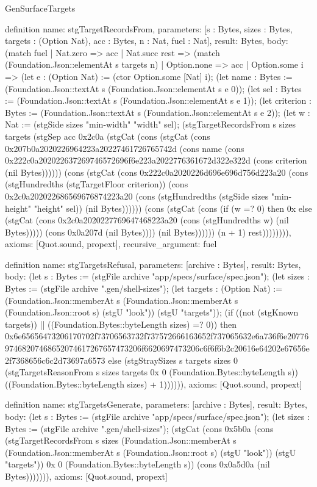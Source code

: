 \begin{lexlean}{GenSurfaceTargets}
\begin{semanticmodule}
definition{
  name: stgTargetRecordsFrom,
  parameters: [s : Bytes, sizes : Bytes, targets : (Option Nat), acc : Bytes, n : Nat, fuel : Nat],
  result: Bytes,
  body: (match fuel
    | Nat.zero => acc
    | Nat.succ rest => (match (Foundation.Json::elementAt s targets n)
      | Option.none => acc
      | Option.some i => (let e : (Option Nat) := (ctor Option.some [Nat] i); (let name : Bytes := (Foundation.Json::textAt s (Foundation.Json::elementAt s e 0)); (let sel : Bytes := (Foundation.Json::textAt s (Foundation.Json::elementAt s e 1)); (let criterion : Bytes := (Foundation.Json::textAt s (Foundation.Json::elementAt s e 2)); (let w : Nat := (stgSide sizes "min-width" "width" sel); (stgTargetRecordsFrom s sizes targets (stgSep acc 0x2c0a (stgCat (cons (stgCat (cons 0x207b0a2020226964223a20227461726765742d (cons name (cons 0x222c0a202022637269746572696f6e223a2022776361672d322e322d (cons criterion (nil Bytes)))))) (cons (stgCat (cons 0x222c0a2020226d696e696d756d223a20 (cons (stgHundredths (stgTargetFloor criterion)) (cons 0x2c0a202022686569676874223a20 (cons (stgHundredths (stgSide sizes "min-height" "height" sel)) (nil Bytes)))))) (cons (stgCat (cons (if (w =? 0) then 0x else (stgCat (cons 0x2c0a2020227769647468223a20 (cons (stgHundredths w) (nil Bytes))))) (cons 0x0a207d (nil Bytes)))) (nil Bytes)))))) (n + 1) rest)))))))),
  axioms: [Quot.sound, propext],
  recursive_argument: fuel
}

definition{
  name: stgTargetsRefusal,
  parameters: [archive : Bytes],
  result: Bytes,
  body: (let s : Bytes := (stgFile archive "app/specs/surface/spec.json"); (let sizes : Bytes := (stgFile archive ".gen/shell-sizes"); (let targets : (Option Nat) := (Foundation.Json::memberAt s (Foundation.Json::memberAt s (Foundation.Json::root s) (stgU "look")) (stgU "targets")); (if ((not (stgKnown targets)) || ((Foundation.Bytes::byteLength sizes) =? 0)) then 0x6e65656473206170702f73706563732f737572666163652f737065632e6a736f6e2077697468207468652074617267657473206f6620697473206c6f6f6b2c20616e64202e67656e2f7368656c6c2d73697a6573 else (stgStraySizes s targets sizes 0 (stgTargetsReasonFrom s sizes targets 0x 0 (Foundation.Bytes::byteLength s)) ((Foundation.Bytes::byteLength sizes) + 1)))))),
  axioms: [Quot.sound, propext]
}

definition{
  name: stgTargetsGenerate,
  parameters: [archive : Bytes],
  result: Bytes,
  body: (let s : Bytes := (stgFile archive "app/specs/surface/spec.json"); (let sizes : Bytes := (stgFile archive ".gen/shell-sizes"); (stgCat (cons 0x5b0a (cons (stgTargetRecordsFrom s sizes (Foundation.Json::memberAt s (Foundation.Json::memberAt s (Foundation.Json::root s) (stgU "look")) (stgU "targets")) 0x 0 (Foundation.Bytes::byteLength s)) (cons 0x0a5d0a (nil Bytes))))))),
  axioms: [Quot.sound, propext]
}
\end{semanticmodule}
\end{lexlean}
